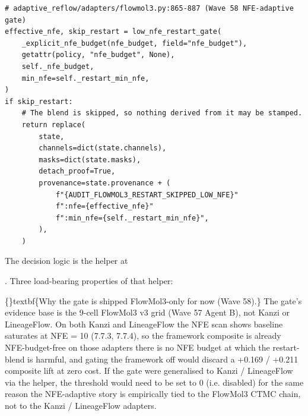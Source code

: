 \documentclass{article}
\begin{document}
\begin{verbatim}
# adaptive_reflow/adapters/flowmol3.py:865-887 (Wave 58 NFE-adaptive gate)
effective_nfe, skip_restart = low_nfe_restart_gate(
    _explicit_nfe_budget(nfe_budget, field="nfe_budget"),
    getattr(policy, "nfe_budget", None),
    self._nfe_budget,
    min_nfe=self._restart_min_nfe,
)
if skip_restart:
    # The blend is skipped, so nothing derived from it may be stamped.
    return replace(
        state,
        channels=dict(state.channels),
        masks=dict(state.masks),
        detach_proof=True,
        provenance=state.provenance + (
            f"{AUDIT_FLOWMOL3_RESTART_SKIPPED_LOW_NFE}"
            f":nfe={effective_nfe}"
            f":min_nfe={self._restart_min_nfe}",
        ),
    )
\end{verbatim}
The decision logic is the  helper at

. Three load-bearing properties of that helper:

\begin{table}[ht]
\centering
\small
{}
\end{table}

\{\}textbf\{Why the gate is shipped FlowMol3-only for now (Wave 58).\} The gate's evidence base is the 9-cell FlowMol3 v3 grid (Wave 57 Agent B), not Kanzi or LineageFlow. On both Kanzi and LineageFlow the NFE scan shows baseline saturates at NFE = 10 (7.7.3, 7.7.4), so the framework composite is already NFE-budget-free on those adapters  there is no NFE budget at which the restart-blend is harmful, and gating the framework off would discard a +0.169 / +0.211 composite lift at zero cost. If the gate were generalised to Kanzi / LineageFlow via the  helper, the threshold would need to be set to 0 (i.e. disabled) for the same reason  the NFE-adaptive story is empirically tied to the FlowMol3 CTMC chain, not to the Kanzi / LineageFlow adapters.
\end{document}
